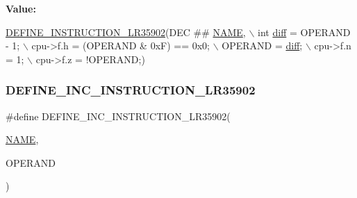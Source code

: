 {\bfseries Value\+:}
\begin{DoxyCode}
\mbox{\hyperlink{isa-lr35902_8c_a3128fc43c5d01e8b51f67901c0b4b5ef}{DEFINE\_INSTRUCTION\_LR35902}}(DEC ## \mbox{\hyperlink{inflate_8h_a164ea0159d5f0b5f12a646f25f99eceaa67bc2ced260a8e43805d2480a785d312}{NAME}}, \(\backslash\)
        \textcolor{keywordtype}{int} \mbox{\hyperlink{isa-lr35902_8c_a65f3a8178e1f997a7a19a988bb0f4e1a}{diff}} = OPERAND - 1; \(\backslash\)
        cpu->f.h = (OPERAND & 0xF) == 0x0; \(\backslash\)
        OPERAND = \mbox{\hyperlink{isa-lr35902_8c_a65f3a8178e1f997a7a19a988bb0f4e1a}{diff}}; \(\backslash\)
        cpu->f.n = 1; \(\backslash\)
        cpu->f.z = !OPERAND;)
\end{DoxyCode}
\mbox{\label{isa-lr35902_8c_a61c163d65cac1659d02b8d28f81febd7}} 
\subsubsection{\texorpdfstring{D\+E\+F\+I\+N\+E\+\_\+\+I\+N\+C\+\_\+\+I\+N\+S\+T\+R\+U\+C\+T\+I\+O\+N\+\_\+\+L\+R35902}{DEFINE\_INC\_INSTRUCTION\_LR35902}}
{\footnotesize\ttfamily \#define D\+E\+F\+I\+N\+E\+\_\+\+I\+N\+C\+\_\+\+I\+N\+S\+T\+R\+U\+C\+T\+I\+O\+N\+\_\+\+L\+R35902(\begin{DoxyParamCaption}\item[{}]{\mbox{\hyperlink{inflate_8h_a164ea0159d5f0b5f12a646f25f99eceaa67bc2ced260a8e43805d2480a785d312}{N\+A\+ME}},  }\item[{}]{O\+P\+E\+R\+A\+ND }\end{DoxyParamCaption})}

